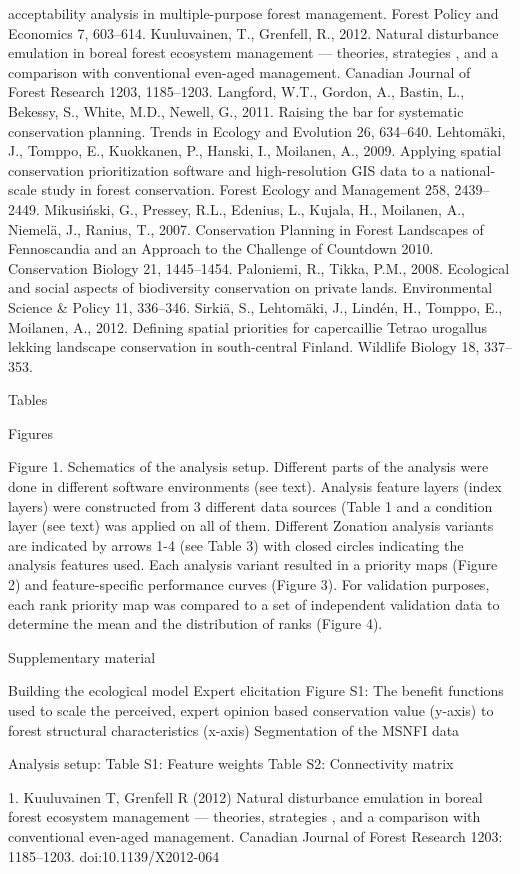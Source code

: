\documentclass[]{article}
\begin{document}
acceptability analysis in multiple-purpose forest management. Forest
Policy and Economics 7, 603--614. Kuuluvainen, T., Grenfell, R., 2012.
Natural disturbance emulation in boreal forest ecosystem management ---
theories, strategies , and a comparison with conventional even-aged
management. Canadian Journal of Forest Research 1203, 1185--1203.
Langford, W.T., Gordon, A., Bastin, L., Bekessy, S., White, M.D.,
Newell, G., 2011. Raising the bar for systematic conservation planning.
Trends in Ecology and Evolution 26, 634--640. Lehtomäki, J., Tomppo, E.,
Kuokkanen, P., Hanski, I., Moilanen, A., 2009. Applying spatial
conservation prioritization software and high-resolution GIS data to a
national-scale study in forest conservation. Forest Ecology and
Management 258, 2439--2449. Mikusiński, G., Pressey, R.L., Edenius, L.,
Kujala, H., Moilanen, A., Niemelä, J., Ranius, T., 2007. Conservation
Planning in Forest Landscapes of Fennoscandia and an Approach to the
Challenge of Countdown 2010. Conservation Biology 21, 1445--1454.
Paloniemi, R., Tikka, P.M., 2008. Ecological and social aspects of
biodiversity conservation on private lands. Environmental Science \&
Policy 11, 336--346. Sirkiä, S., Lehtomäki, J., Lindén, H., Tomppo, E.,
Moilanen, A., 2012. Defining spatial priorities for capercaillie Tetrao
urogallus lekking landscape conservation in south-central Finland.
Wildlife Biology 18, 337--353.

Tables

Figures

Figure 1. Schematics of the analysis setup. Different parts of the
analysis were done in different software environments (see text).
Analysis feature layers (index layers) were constructed from 3 different
data sources (Table 1 and a condition layer (see text) was applied on
all of them. Different Zonation analysis variants are indicated by
arrows 1-4 (see Table 3) with closed circles indicating the analysis
features used. Each analysis variant resulted in a priority maps (Figure
2) and feature-specific performance curves (Figure 3). For validation
purposes, each rank priority map was compared to a set of independent
validation data to determine the mean and the distribution of ranks
(Figure 4).

Supplementary material

Building the ecological model Expert elicitation Figure S1: The benefit
functions used to scale the perceived, expert opinion based conservation
value (y-axis) to forest structural characteristics (x-axis)
Segmentation of the MSNFI data

Analysis setup: Table S1: Feature weights Table S2: Connectivity matrix

1. Kuuluvainen T, Grenfell R (2012) Natural disturbance emulation in
boreal forest ecosystem management --- theories, strategies , and a
comparison with conventional even-aged management. Canadian Journal of
Forest Research 1203: 1185--1203. doi:10.1139/X2012-064
\end{document}
